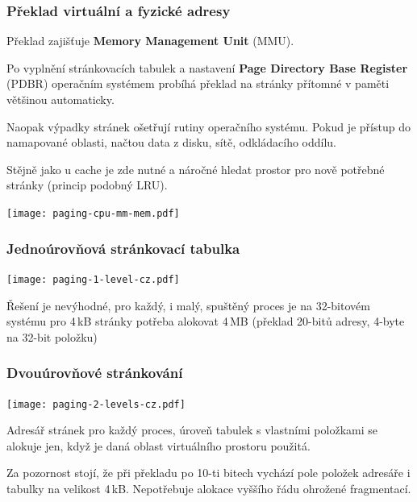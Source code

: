 \documentclass{beamer}
\begin{document}
\begin{frame}
\frametitle{Překlad virtuální a fyzické adresy}

Překlad zajišťuje \textbf{Memory Management Unit} (MMU).

Po vyplnění stránkovacích tabulek a nastavení \textbf{Page Directory Base Register}
(PDBR) operačním systémem probíhá překlad na stránky přítomné v paměti většinou automaticky.

Naopak výpadky stránek ošetřují rutiny operačního systému. Pokud je přístup do namapované
oblasti, načtou data z disku, sítě, odkládacího oddílu.

Stějně jako u cache je zde nutné a náročné hledat prostor pro nově potřebné stránky (princip podobný LRU).

\vskip 2mm

{
\centering

\texttt{[image: paging-cpu-mm-mem.pdf]}

}
\end{frame}

\begin{frame}
\frametitle{Jednoúrovňová stránkovací tabulka}

{
\centering

\texttt{[image: paging-1-level-cz.pdf]}

}

Řešení je nevýhodné, pro každý, i malý, spuštěný proces je na 32-bitovém
systému pro 4\,kB stránky potřeba alokovat 4\,MB (překlad 20-bitů adresy,
4-byte na 32-bit položku) 

\end{frame}


\begin{frame}
\frametitle{Dvouúrovňové stránkování}

{
\centering

\texttt{[image: paging-2-levels-cz.pdf]}

}

Adresář stránek pro každý proces, úroveň tabulek s vlastními položkami
se alokuje jen, když je daná oblast virtuálního prostoru použitá.

Za pozornost stojí, že při překladu po 10-ti bitech vychází pole položek
adresáře i tabulky na velikost 4\,kB. Nepotřebuje alokace vyššího řádu
ohrožené fragmentací.

\end{frame}
\end{document}
